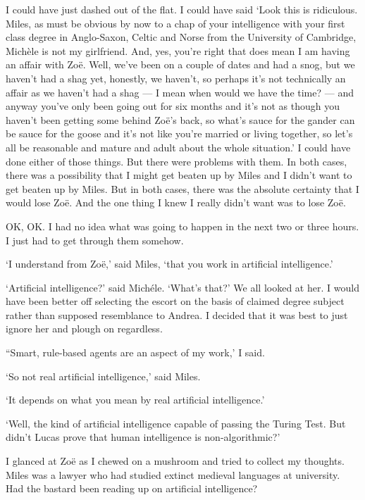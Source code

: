 I could have just dashed out of the flat. I could have said `Look
this is ridiculous. Miles, as must be obvious by now to a chap of
your intelligence with your first class degree in Anglo-Saxon, Celtic and Norse from the University of Cambridge, Michèle is not my girlfriend. And, yes,
you're right that does mean I am having an affair with Zoë.
Well, we've been on a couple of dates and had a snog, but we haven't
had a shag yet, honestly, we haven't, so perhaps it's not
technically an affair as we haven't had a shag --- I mean when would we have the time? --- and anyway you've
only been going out for six months and it's not as though you
haven't been getting some behind Zoë's back, so what's sauce for
the gander can be sauce for the goose and it's not like you're
married or living together, so let's all be reasonable and mature
and adult about the whole situation.' I could have done either of
those things. But there were problems with them. In both cases,
there was a possibility that I might get beaten up by Miles and I
didn't want to get beaten up by Miles. But in both cases, there was
the absolute certainty that I would lose Zoë. And the one thing
I knew I really didn't want was to lose Zoë.

OK, OK. I had no idea what was going to happen in the next two or
three hours. I just had to get through them somehow.

`I understand from Zoë,' said Miles, `that you work in
artificial intelligence.'

`Artificial intelligence?' said Michéle. `What's that?' We all
looked at her. I would have been better off selecting the escort on
the basis of claimed degree subject rather than supposed resemblance
to Andrea. I decided that it was best to just ignore her and plough
on regardless.

``Smart, rule-based agents are an aspect of my work,' I said.

`So not {\twelveit real\/} artificial intelligence,' said Miles.

`It depends on what you mean by real artificial intelligence.'

`Well, the kind of artificial intelligence capable of passing the
Turing Test. But didn't Lucas prove that human intelligence is
non-algorithmic?'

I glanced at Zoë as I chewed on a mushroom and tried to collect
my thoughts. Miles was a lawyer who had studied extinct medieval
languages at university. Had the bastard been reading up on
artificial intelligence?

